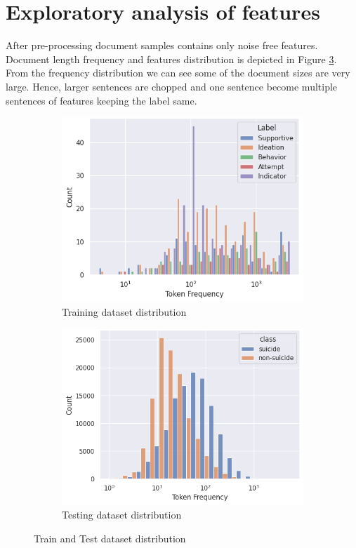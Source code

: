 \documentclass[sn-mathphys,Numbered]{sn-jnl}%
\theoremstyle{thmstyleone}%
\theoremstyle{thmstyletwo}%
\theoremstyle{thmstylethree}%
\begin{document}
\section{Exploratory analysis of features}
\label{exp_anal}
After pre-processing document samples contains only noise free features. Document length frequency and features distribution is depicted in Figure \ref{redditdist_twitterdist_together}. From the frequency distribution we can see some of the document sizes are very large. Hence, larger sentences are chopped and one sentence become multiple sentences of features keeping the label same. 
\begin{figure}[H]
\centering
\begin{subfigure}{0.45\textwidth}
    \includegraphics[width=\textwidth]{reddit_dist.png}
    \caption{Training dataset distribution}
    \label{redditdist}
\end{subfigure}
\hfill
\begin{subfigure}{0.45\textwidth}
    \includegraphics[width=\textwidth]{twitterdist.png}
    \caption{Testing dataset distribution}
    \label{twitterdist}
\end{subfigure}       
\caption{Train and Test dataset distribution}
\label{redditdist_twitterdist_together}
\end{figure}
\end{document}

